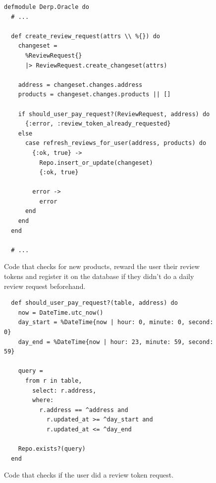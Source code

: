 \documentclass[12pt,a4paper,oneside]{article}
\theoremstyle{definition}
\begin{document}
\begin{figure}[h]
	\begin{verbatim}
defmodule Derp.Oracle do
  # ...

  def create_review_request(attrs \\ %{}) do
    changeset =
      %ReviewRequest{}
      |> ReviewRequest.create_changeset(attrs)

    address = changeset.changes.address
    products = changeset.changes.products || []

    if should_user_pay_request?(ReviewRequest, address) do
      {:error, :review_token_already_requested}
    else
      case refresh_reviews_for_user(address, products) do
        {:ok, true} ->
          Repo.insert_or_update(changeset)
          {:ok, true}

        error ->
          error
      end
    end
  end
  
  # ...
    \end{verbatim}
	\label{code:create-review-request}
	\caption{Code that checks for new products, reward the user their review tokens and register it on the database if they didn't do a daily review request beforehand.}
\end{figure}

\begin{figure}[H]
	\begin{verbatim}
  def should_user_pay_request?(table, address) do
    now = DateTime.utc_now()
    day_start = %DateTime{now | hour: 0, minute: 0, second: 0}
    day_end = %DateTime{now | hour: 23, minute: 59, second: 59}

    query =
      from r in table,
        select: r.address,
        where:
          r.address == ^address and
            r.updated_at >= ^day_start and
            r.updated_at <= ^day_end

    Repo.exists?(query)
  end
    \end{verbatim}
	\label{code:request-check}
	\caption{Code that checks if the user did a review token request.}
\end{figure}
\end{document}
